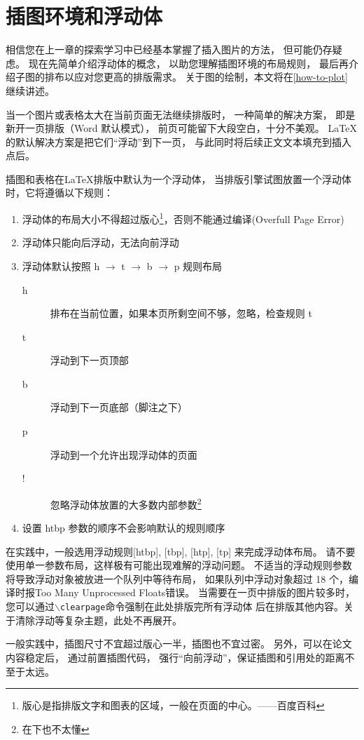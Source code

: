 \section{插图环境和浮动体}

相信您在上一章的探索学习中已经基本掌握了插入图片的方法，
但可能仍存疑虑。
现在先简单介绍浮动体的概念，
以助您理解插图环境的布局规则，
最后再介绍子图的排布以应对您更高的排版需求。
关于图的绘制，本文将在\ref{how-to-plot} 继续讲述。 %

当一个图片或表格太大在当前页面无法继续排版时，
一种简单的解决方案，
即是新开一页排版（Word 默认模式），
前页可能留下大段空白，十分不美观。
\LaTeX 的默认解决方案是把它们“浮动”到下一页，
与此同时将后续正文文本填充到插入点后。

插图和表格在\LaTeX 排版中默认为一个浮动体，
当排版引擎试图放置一个浮动体时，它将遵循以下规则：
\begin{enumerate}
    \item 浮动体的布局大小不得超过版心\footnote{版心是指排版文字和图表的区域，一般在页面的中心。——百度百科}，否则不能通过编译(Overfull Page Error)
    \item 浮动体只能向后浮动，无法向前浮动
    \item 浮动体默认按照 h $\to$ t $\to$ b $\to$ p 规则布局
    \begin{description}
        \item[h] 排布在当前位置，如果本页所剩空间不够，忽略，检查规则 t
        \item[t] 浮动到下一页顶部
        \item[b] 浮动到下一页底部（脚注之下）
        \item[p] 浮动到一个允许出现浮动体的页面
        \item[!] 忽略浮动体放置的大多数内部参数\footnote{在下也不太懂}
    \end{description}
    \item 设置 htbp 参数的顺序不会影响默认的规则顺序
\end{enumerate}
在实践中，一般选用浮动规则[htbp], [tbp], [htp], [tp] 来完成浮动体布局。
请不要使用单一参数布局，这样极有可能出现难解的浮动问题。
不适当的浮动规则参数将导致浮动对象被放进一个队列中等待布局，
如果队列中浮动对象超过 18 个，编译时报Too Many Unprocessed Floats错误。
当需要在一页中排版的图片较多时，
您可以通过\texttt{$\backslash$clearpage}命令强制在此处排版完所有浮动体
后在排版其他内容。关于清除浮动等复杂主题，此处不再展开。

一般实践中，插图尺寸不宜超过版心一半，插图也不宜过密。
另外，可以在论文内容稳定后，
通过前置插图代码，
强行“向前浮动”，保证插图和引用处的距离不至于太远。

